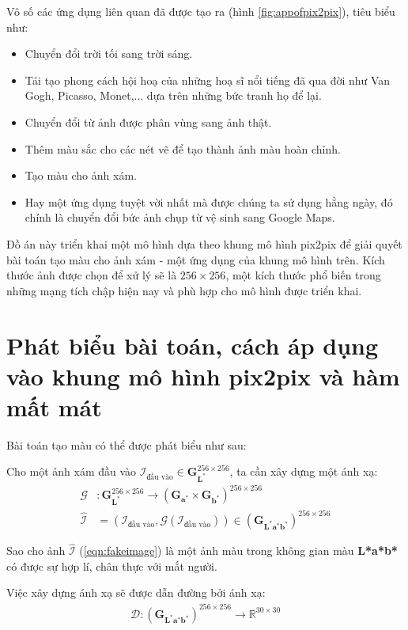 \documentclass[a4paper, 12pt]{report}
\begin{document}
Vô số các ứng dụng liên quan đã được tạo ra (hình \ref{fig:appofpix2pix}), tiêu biểu như:

\begin{itemize}
    \item Chuyển đổi trời tối sang trời sáng.
    \item Tái tạo phong cách hội hoạ của những hoạ sĩ nổi tiếng đã qua đời như Van Gogh, Picasso, Monet,... dựa trên những bức tranh họ để lại.
    \item Chuyển đổi từ ảnh được phân vùng sang ảnh thật.
    \item Thêm màu sắc cho các nét vẽ để tạo thành ảnh màu hoàn chỉnh.
    \item Tạo màu cho ảnh xám.
    \item Hay một ứng dụng tuyệt vời nhất mà được chúng ta sử dụng hằng ngày, đó chính là chuyển đổi bức ảnh chụp từ vệ sinh sang Google Maps.
\end{itemize}

Đồ án này triển khai một mô hình dựa theo khung mô hình pix2pix để giải quyết bài toán tạo màu cho ảnh xám - một ứng dụng của khung mô hình trên.
Kích thước ảnh được chọn để xử lý sẽ là $256 \times 256$, một kích thước phổ biến trong những mạng tích chập hiện nay và phù hợp cho mô hình được triển khai.

\section{Phát biểu bài toán, cách áp dụng vào khung mô hình pix2pix và hàm mất mát}

Bài toán tạo màu có thể được phát biểu như sau:

\begin{tcolorbox}
Cho một ảnh xám đầu vào $\mathcal{I}_{\text{đầu vào}} \in \bm{G}_{\mathbf{L}^*}^{256 \times 256}$, ta cần xây dựng một ánh xạ:
\begin{align}
    \mathcal{G}&: \bm{G}_{\mathbf{L}^*}^{256 \times 256} \rightarrow \left(\bm{G}_{\mathbf{a}^*} \times \bm{G}_{\mathbf{b}^*}\right)^{256 \times 256}\\
    \widehat{\mathcal{I}} &= \left(\mathcal{I}_{\text{đầu vào}}, \mathcal{G}\left(\mathcal{I}_{\text{đầu vào}}\right)\right) \in \left(\bm{G}_{\mathbf{L^*}\mathbf{a^*}\mathbf{b^*}}\right)^{256 \times 256}\label{eqn:fakeimage}
\end{align}

Sao cho ảnh $\widehat{\mathcal{I}}$ (\ref{eqn:fakeimage}) là một ảnh màu trong không gian màu \textbf{L*a*b*} có được sự hợp lí, chân thực với mắt người.\vspace{5pt}

Việc xây dựng ánh xạ sẽ được dẫn đường bởi ánh xạ:
\begin{align}
    \mathcal{D}:\left(\bm{G}_{\mathbf{L^*}\mathbf{a^*}\mathbf{b^*}}\right)^{256 \times 256} \rightarrow \mathbb{R}^{30 \times 30}
\end{align}

\end{tcolorbox}
\end{document}
